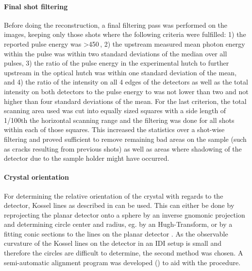 \paragraph{Final shot filtering}
Before doing the reconstruction, a final filtering pass was performed on the images, keeping only those shots where the following criteria were fulfilled: 1)  the reported pulse energy was >450\,\microjoule, 2) the upstream measured mean photon energy within the pulse was within two standard deviations of the median over all pulses, 3) the ratio of the pulse energy in the experimental hutch to further upstream in the optical hutch was within one standard deviation of the mean, and 4) the ratio of the intensity on all 4 edges of the detectors as well as the total intensity on both detectors to the pulse energy to was not lower than two and not higher than four standard deviations of the mean.  For the last criterion, the total scanning area used was cut into equally sized squares with a side length of 1/100th the horizontal scanning range and the filtering was done for all shots within each of those squares. This increased the statistics over a shot-wise filtering and proved sufficient to remove remaining bad areas on the sample (such as cracks resulting from previous shots) as well as areas where shadowing of the detector due to the sample holder might have occurred.










\paragraph{Crystal orientation}
For determining the relative orientation of the crystal with regards to the detector, Kossel lines as described in  can be used. This can either be done by reprojecting the planar detector onto a sphere by an inverse gnomonic projection and determining circle center and radius, eg. by an Hugh-Transform, or by a fitting conic sections to the lines on the planar detector \cite{morris1968,morawiec2016,faigel2016,herron2018}. As the observable curvature of the Kossel lines on the detector in an IDI setup is small and therefore the circles are difficult to determine, the second method was chosen. A semi-automatic alignment program was developed () to aid with the procedure.


